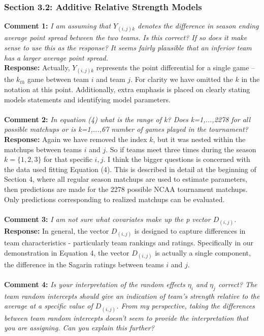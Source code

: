 \documentclass[11pt]{article} %
\begin{document}
\subsubsection*{Section 3.2: Additive Relative Strength Models}
{\bf Comment 1:} \emph{I am assuming that $Y_{(i,j)k}$ denotes the difference in season ending average point spread between the two teams. Is this correct? If so does it make sense to use this as the response? It seems fairly plausible that an inferior team has a larger average point spread.\\}
{\bf Response:} Actually, $Y_{(i,j)k}$ represents the point differential for a single game -- the $k_{th}$ game between team $i$ and team $j$. For clarity we have omitted the $k$ in the notation at this point. Additionally, extra emphasis is placed on clearly stating models statements and identifying model parameters.\\
\\
{\bf Comment 2:} \emph{In equation (4) what is the range of k? Does k=1,...,2278 for all possible matchups or is k=1,...,67 number of games played in the tournament?\\}
{\bf Response:} Again we have removed the index $k$, but it was nested within the matchups between teams $i$ and $j$. So if teams meet three times during the season $k = \{1,2,3\}$ for that specific $i,j$. I think the bigger questions is concerned with the data used fitting Equation (4). This is described in detail at the beginning of Section 4, where all regular season matchups are used to estimate parameters, then predictions are made for the 2278 possible NCAA tournament matchups. Only predictions corresponding to realized matchups can be evaluated.\\
\\
{\bf Comment 3:} \emph{I am not sure what covariates make up the p vector $D_{(i,j)}$.\\}
{\bf Response:} In general, the vector $D_{(i,j)}$ is designed to capture differences in team characteristics - particularly team rankings and ratings. Specifically in our demonstration in Equation 4, the vector $D_{(i,j)}$ is actually a  single component, the difference in the Sagarin ratings between teams $i$ and $j$.  \\
\\
{\bf Comment 4:} \emph{Is your interpretation of the random effects $\eta_i$ and $\eta_j$ correct? The team random intercepts should give an indication of team's strength relative to the average at a specific value of $D_{(i,j)}$. From my perspective, taking the differences between team random intercepts doesn't seem to provide the interpretation that you are assigning. Can you explain this further?\\}
\end{document}
